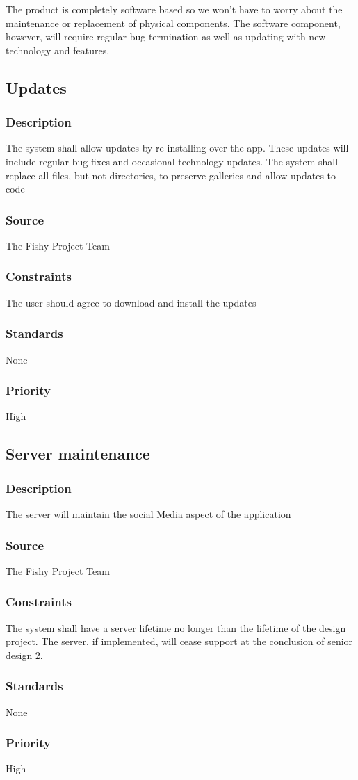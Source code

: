 The product is completely software based so we won't have to worry about the maintenance or replacement of physical components. The software component, however, will require regular bug termination as well as updating with new technology and features.

\subsection{Updates}
\subsubsection{Description}
The system shall allow updates by re-installing over the app. These updates will include regular bug fixes and occasional technology updates. The system shall replace all files, but not directories, to preserve galleries and allow updates to code
\subsubsection{Source}
The Fishy Project Team
\subsubsection{Constraints}
The user should agree to download and install the updates
\subsubsection{Standards}
None
\subsubsection{Priority}
High\\

\subsection{Server maintenance}
\subsubsection{Description}
The server will maintain the social Media aspect of the application
\subsubsection{Source}
The Fishy Project Team
\subsubsection{Constraints}
The system shall have a server lifetime no longer than the lifetime of the design project. The server, if implemented, will cease support at the conclusion of senior design 2.
\subsubsection{Standards}
None
\subsubsection{Priority}
High